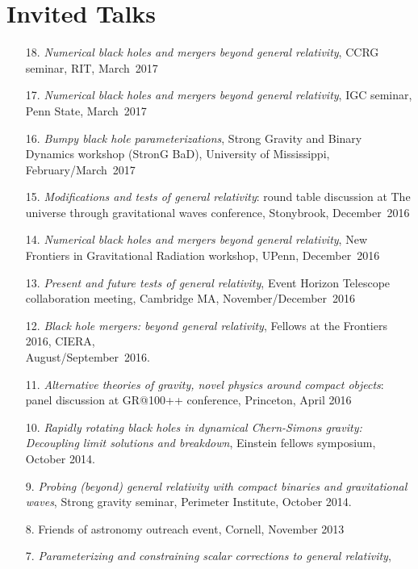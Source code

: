 \newcommand{\playsymbol}{$\blacktriangleright$}
\section{\sc Invited Talks}
\begin{enumerate}
\item[{18.}] {\it Numerical black holes and mergers beyond general
    relativity}, CCRG seminar, RIT, March~2017
\item[{17.}] {\it Numerical black holes and mergers beyond general
    relativity}, IGC seminar, Penn State, March~2017
\item[{16.}] {\it Bumpy black hole parameterizations}, Strong Gravity
  and Binary Dynamics workshop (StronG BaD), University of
  Mississippi, February/March~2017
\item[{15.}] {\it Modifications and tests of general relativity}:
  round table discussion at
  The universe through gravitational waves conference,
  Stonybrook, December~2016
\item[{14.}] {\it Numerical black holes and mergers beyond general relativity},
  New Frontiers in Gravitational Radiation workshop, UPenn, December~2016
\item[{13.}] {\it Present and future tests of general relativity},
  Event Horizon Telescope collaboration meeting, Cambridge MA,
  November/December~2016
\item[{12.}] {\it Black hole mergers: beyond general relativity},
  Fellows at the Frontiers 2016, CIERA,\\ August/September~2016.
\item[{11.}] {\it Alternative theories of gravity, novel physics
    around compact objects}: panel discussion at GR@100++ conference,
  Princeton, April 2016
\item[{10.}] {\it Rapidly rotating black holes in dynamical Chern-Simons gravity:
    Decoupling limit solutions and breakdown},
 Einstein fellows symposium, October 2014.
\item[{9.}] {\it Probing (beyond) general relativity with compact binaries and
    gravitational waves},
  Strong gravity seminar, Perimeter Institute, October 2014.
\item[{8.}]
  Friends of astronomy outreach event, Cornell, November 2013
\item[{7.}] {\it Parameterizing and constraining scalar corrections to general relativity},

\end{enumerate}
